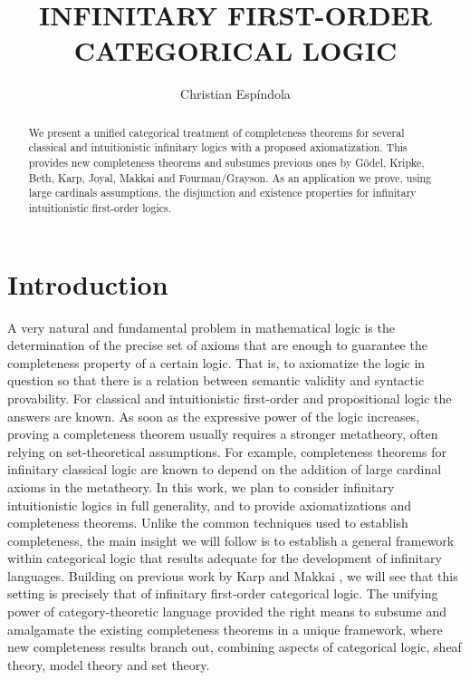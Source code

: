 \documentclass[a4paper,11pt]{article}
\title{INFINITARY FIRST-ORDER CATEGORICAL LOGIC}
\author{Christian Esp\'indola}
\theoremstyle{plain}
\theoremstyle{plain}
\theoremstyle{remark}
\begin{document}
\date{}
\maketitle

\begin{abstract}
We present a unified categorical treatment of completeness theorems for several classical and intuitionistic infinitary logics with a proposed axiomatization. This provides new completeness theorems and subsumes previous ones by G\"odel, Kripke, Beth, Karp, Joyal, Makkai and Fourman/Grayson. As an application we prove, using large cardinals assumptions, the disjunction and existence properties for infinitary intuitionistic first-order logics.
\end{abstract}

\tableofcontents

\section{Introduction}

A very natural and fundamental problem in mathematical logic is the determination of the precise set of axioms that are enough to guarantee the completeness property of a certain logic. That is, to axiomatize the logic in question so that there is a relation between semantic validity and syntactic provability. For classical and intuitionistic first-order and propositional logic the answers are known. As soon as the expressive power of the logic increases, proving a completeness theorem usually requires a stronger metatheory, often relying on set-theoretical assumptions. For example, completeness theorems for infinitary classical logic are known to depend on the addition of large cardinal axioms in the metatheory. In this work, we plan to consider infinitary intuitionistic logics in full generality, and to provide axiomatizations and completeness theorems. Unlike the common techniques used to establish completeness, the main insight we will follow is to establish a general framework within categorical logic that results adequate for the development of infinitary languages. Building on previous work by Karp \cite{karp} and Makkai \cite{makkai}, we will see that this setting is precisely that of infinitary first-order categorical logic. The unifying power of category-theoretic language provided the right means to subsume and amalgamate the existing completeness theorems in a unique framework, where new completeness results branch out, combining aspects of categorical logic, sheaf theory, model theory and set theory.
\end{document}
